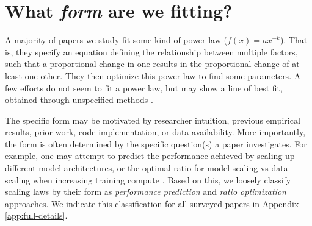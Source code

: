 
\section{What \emph{form} are we fitting?}\label{sec:power-law-form}


A majority of papers we study fit some kind of power law ($f(x)=ax^{-k}$). That is, they specify an equation defining the relationship between multiple factors, such that a proportional change in one results in the proportional change of at least one other. 
They then optimize this power law to find some parameters. 
A few efforts do not seem to fit a power law, but may show a line of best fit, obtained through unspecified methods \citep{rae2021scaling,dettmers2022llm,tay2022scaling,shin2023scaling,schaeffer2023emergent,poli2024mechanistic}.



 
 The specific form may be motivated by researcher intuition, previous empirical results, prior work, code implementation, or data availability. More importantly, the form is often determined by the specific question(s) a paper investigates. For example, one may attempt to predict the performance achieved by scaling up different model architectures, or the optimal ratio for model scaling vs data scaling when increasing training compute \citep{kaplan2020scaling,hoffmann2022training}. Based on this, we loosely classify scaling laws by their form as \textit{performance prediction} and \textit{ratio optimization} approaches. We indicate this classification for all surveyed papers in Appendix \ref{app:full-details}.

